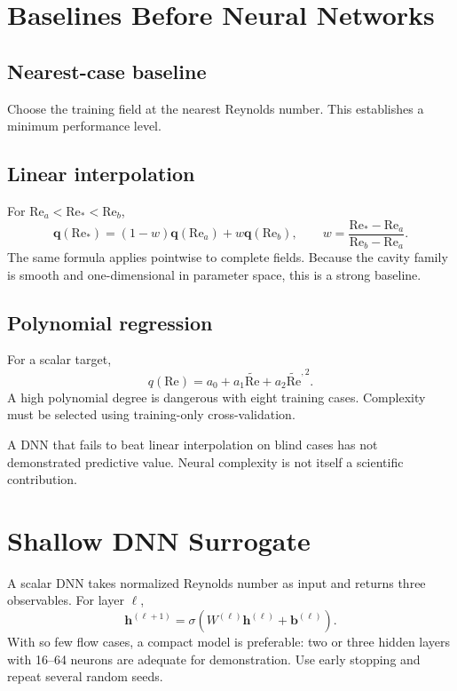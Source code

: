 \documentclass[11pt]{article}
\newcommand{\Rey}{\mathrm{Re}}
\newcommand{\vect}[1]{\bm{#1}}
\begin{document}
\section{Baselines Before Neural Networks}
\subsection{Nearest-case baseline}
Choose the training field at the nearest Reynolds number. This establishes a minimum performance level.

\subsection{Linear interpolation}
For $\Rey_a<\Rey_*<\Rey_b$,
\begin{equation}
\vect{q}(\Rey_*)=(1-w)\vect{q}(\Rey_a)+w\vect{q}(\Rey_b),\qquad
w=\frac{\Rey_*-\Rey_a}{\Rey_b-\Rey_a}.
\end{equation}
The same formula applies pointwise to complete fields. Because the cavity family is smooth and one-dimensional in parameter space, this is a strong baseline.

\subsection{Polynomial regression}
For a scalar target,
\begin{equation}
q(\Rey)=a_0+a_1\widetilde{\Rey}+a_2\widetilde{\Rey}^{,2}.
\end{equation}
A high polynomial degree is dangerous with eight training cases. Complexity must be selected using training-only cross-validation.

\begin{researchbox}
A DNN that fails to beat linear interpolation on blind cases has not demonstrated predictive value. Neural complexity is not itself a scientific contribution.
\end{researchbox}

\section{Shallow DNN Surrogate}
A scalar DNN takes normalized Reynolds number as input and returns three observables. For layer $\ell$,
\begin{equation}
\vect{h}^{(\ell+1)}=\sigma\!\left(W^{(\ell)}\vect{h}^{(\ell)}+\vect{b}^{(\ell)}\right).
\end{equation}
With so few flow cases, a compact model is preferable: two or three hidden layers with 16--64 neurons are adequate for demonstration. Use early stopping and repeat several random seeds.
\end{document}
